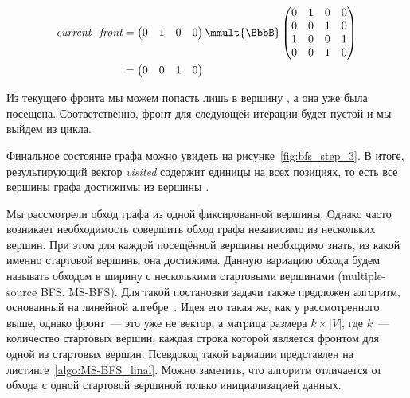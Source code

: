 \begin{example}
    \begin{align*}
        \emph{current\_front} & =
        \begin{pmatrix}
            0 & 1 & 0 & 0
        \end{pmatrix}\mmult{\BbbB}
        \begin{pmatrix}
            0 & 1 & 0 & 0 \\
            0 & 0 & 1 & 0 \\
            1 & 0 & 0 & 1 \\
            0 & 0 & 1 & 0
        \end{pmatrix}            \\ &=
        \begin{pmatrix}
            0 & 0 & 1 & 0
        \end{pmatrix}
    \end{align*}

    Из текущего фронта мы можем попасть лишь в вершину , а она уже была посещена.
    Соответственно, фронт для следующей итерации будет пустой и мы выйдем из цикла.

    \begin{marginfigure}
        \begin{center}
            \resizebox{\marginparwidth}{!}{}
        \end{center}
        \caption{Обход в ширину, шаг третий}
        \label{fig:bfs_step_3}
    \end{marginfigure}

    Финальное состояние графа можно увидеть на рисунке~\ref{fig:bfs_step_3}.
    В итоге, результирующий вектор \emph{visited} содержит единицы на всех позициях, то есть все вершины графа достижимы из вершины .

\end{example}

Мы рассмотрели обход графа из одной фиксированной вершины.
Однако часто возникает необходимость совершить обход графа независимо из нескольких вершин.
При этом для каждой посещённой вершины необходимо знать, из какой именно стартовой вершины она достижима.
Данную вариацию обхода будем называть обходом в ширину с несколькими стартовыми вершинами (multiple-source BFS, MS-BFS).
Для такой постановки задачи также предложен алгоритм, основанный на линейной алгебре~.
Идея его такая же, как у рассмотренного выше, однако фронт~--- это уже не вектор, а матрица размера $k \times |V|$, где $k$~--- количество стартовых вершин, каждая строка которой является фронтом для одной из стартовых вершин.
Псевдокод такой вариации представлен на листинге~\ref{algo:MS-BFS_linal}.
Можно заметить, что алгоритм отличается от обхода с одной стартовой вершиной только инициализацией данных.

